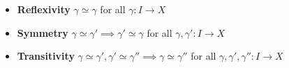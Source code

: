 \documentclass[preview]{standalone}
\begin{document}
\begin{center}
\begin{itemize} \item \textbf{Reflexivity} $\gamma \simeq \gamma$ for all $\gamma : I \to X$ \item \textbf{Symmetry} $\gamma\simeq \gamma' \implies \gamma'\simeq\gamma$ for all $\gamma,\gamma':I\to X$ \item \textbf{Transitivity} $\gamma\simeq \gamma', \gamma'\simeq\gamma''\implies\gamma\simeq\gamma''$ for all $\gamma,\gamma',\gamma'' : I \to X$\end{itemize}
\end{center}
\end{document}
